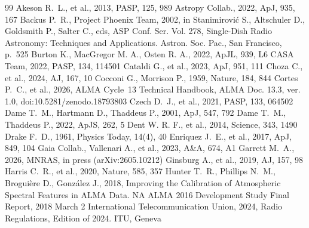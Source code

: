 \documentclass[twocolumn,twocolappendix,numberedappendix,appendixfloats]{openjournal}
\begin{document}
%
%
%
%
%
\fi
\begin{thebibliography}{99}
 Akeson R.~L., et al., 2013, PASP, 125, 989
 Astropy Collab., 2022, ApJ, 935, 167
 Backus P.~R., Project Phoenix Team, 2002, in Stanimirovi\'{c} S., Altschuler D., Goldsmith P., Salter C., eds, ASP Conf. Ser. Vol. 278, Single-Dish Radio Astronomy: Techniques and Applications. Astron. Soc. Pac., San Francisco, p.~525
 Burton K., MacGregor M. A., Osten R. A., 2022, ApJL, 939, L6
 CASA Team, 2022, PASP, 134, 114501
 Cataldi G., et al., 2023, ApJ, 951, 111
 Choza C., et al., 2024, AJ, 167, 10
 Cocconi G., Morrison P., 1959, Nature, 184, 844
 Cortes P.~C., et al., 2026, ALMA Cycle~13 Technical Handbook, ALMA Doc. 13.3, ver. 1.0, doi:10.5281/zenodo.18793803
 Czech D.~J., et al., 2021, PASP, 133, 064502
 Dame T.~M., Hartmann D., Thaddeus P., 2001, ApJ, 547, 792
 Dame T.~M., Thaddeus P., 2022, ApJS, 262, 5
 Dent W. R. F., et al., 2014, Science, 343, 1490
 Drake F.~D., 1961, Physics Today, 14(4), 40
 Enriquez J.~E., et al., 2017, ApJ, 849, 104
 Gaia Collab., Vallenari A., et al., 2023, A\&A, 674, A1
 Garrett M.~A., 2026, MNRAS, in press (arXiv:2605.10212)
 Ginsburg A., et al., 2019, AJ, 157, 98
 Harris C.~R., et al., 2020, Nature, 585, 357
 Hunter T.~R., Phillips N.~M., Brogui\`{e}re D., Gonz\'{a}lez J., 2018, Improving the Calibration of Atmospheric Spectral Features in ALMA Data. NA ALMA 2016 Development Study Final Report, 2018 March 2
 International Telecommunication Union, 2024, Radio Regulations, Edition of 2024. ITU, Geneva

\end{thebibliography}
\end{document}
